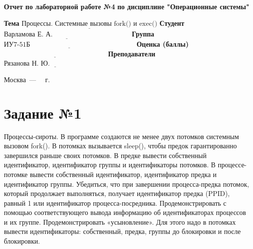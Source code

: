 \documentclass[12pt]{report}
\begin{document}
\begin{titlepage}
	
	\begin{center}
		\noindent\begin{minipage}{1.3\textwidth}\centering
			\Large\textbf{  Отчет по лабораторной работе №4}\newline
			\textbf{по дисциплине "Операционные системы"}\newline\newline
		\end{minipage}
	\end{center}
	
	\noindent\textbf{Тема} $\underline{\text{Процессы. Системные вызовы fork() и exec()}}$\newline\newline
	\noindent\textbf{Студент} $\underline{\text{Варламова Е. А. ~~~~~~~~~~~~~~~~~~~~~~~~~~~~~~~~~}}$\newline\newline
	\noindent\textbf{Группа} $\underline{\text{ИУ7-51Б~~~~~~~~~~~~~~~~~~~~~~~~~~~~~~~~~~~~~~~~~~~~~~}}$\newline\newline
	\noindent\textbf{Оценка (баллы)} $\underline{\text{~~~~~~~~~~~~~~~~~~~~~~~~~~~~~~~~~~~~~~~~~~~~~}}$\newline\newline
	\noindent\textbf{Преподаватели} $\underline{\text{Рязанова Н. Ю.~~~~~~~~~~~~~~~~~~~~~~~~~}}$\newline\newline\newline
	
	\begin{center}
		\vfill
		Москва~---~\the\year
		~г.
	\end{center}
\end{titlepage}

\newpage

\section*{Задание №1}

Процессы-сироты. В программе создаются не менее двух потомков системным вызовом fork(). В потомках вызывается sleep(), чтобы предок гарантированно завершился раньше своих потомков. В предке вывести собственный идентификатор, идентификатор группы и идентификаторы потомков. В процессе-потомке вывести собственный идентификатор, идентификатор предка и идентификатор группы. Убедиться, что при завершении процесса-предка потомок, который продолжает выполняться, получает идентификатор предка (PPID), равный 1 или идентификатор процесса-посредника. Продемонстрировать с помощью соответствующего вывода информацию об идентификаторах процессов и их группе. Продемонстрировать «усыновление». Для этого надо в потомках вывести идентификаторы: собственный, предка, группы до блокировки и после блокировки.
\end{document}
